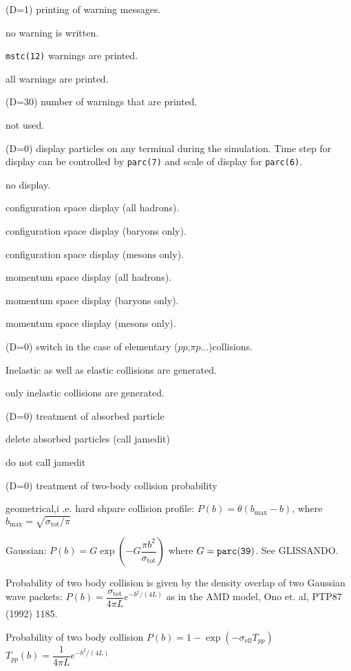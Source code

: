 \documentclass[]{article}
\newenvironment{entry}%
{\begin{list}{}{\setlength{\topsep}{0mm} \setlength{\itemsep}{0mm}
\setlength{\parskip}{0mm} \setlength{\parsep}{0mm}
\setlength{\leftmargin}{20mm} \setlength{\rightmargin}{0mm}
\setlength{\labelwidth}{18mm} \setlength{\labelsep}{2mm}}}%
{\end{list}}
\newenvironment{subentry}%
{\begin{list}{}{\setlength{\topsep}{0mm} \setlength{\itemsep}{0mm}
\setlength{\parskip}{0mm} \setlength{\parsep}{0mm}
\setlength{\leftmargin}{10mm} \setlength{\rightmargin}{0mm}
\setlength{\labelwidth}{18mm} \setlength{\labelsep}{2mm}}}%
{\end{list}}
\newcommand{\ttt}[1]{{\tt#1}}
\newcommand{\itemt}[1]{\item[{\tt #1}\hfill]}
\begin{document}
\begin{entry}
\itemt{mstc(13)  :} (D=1) printing of warning messages.
  \begin{subentry}
        \itemt{$=0$:} no warning is written.
        \itemt{$=1$:} \ttt{mstc(12)} warnings are printed.
        \itemt{$=2$:} all warnings are printed.
  \end{subentry}

\itemt{mstc(14)  :} (D=30) number of warnings that are printed.

\itemt{mstc(15)  :} not used.

\itemt{mstc(16)  :}(D=0) display particles on any terminal during the 
                   simulation.  Time step for display can be controlled
                   by \ttt{parc(7)} and scale of display for \ttt{parc(6)}.
\begin{subentry}
       \itemt{$=0$ :} no display.
       \itemt{$=1$ :} configuration space display (all hadrons).
       \itemt{$=2$ :} configuration space display (baryons only).
       \itemt{$=3$ :} configuration space display (mesons only).
       \itemt{$=11$:} momentum space display (all hadrons).
       \itemt{$=12$:} momentum space display (baryons only).
       \itemt{$=13$:} momentum space display (mesons only).
\end{subentry}

\itemt{mstc(17):} (D=0) switch in the case of elementary
           ($pp$,$\pi p$...)collisions.
\begin{subentry}
       \itemt{$=0$ :} Inelastic as well as  elastic collisions are
                      generated.
       \itemt{$=1$ :} only inelastic collisions are generated.
\end{subentry}

\itemt{mstc(18):}(D=0)  treatment of absorbed particle
\begin{subentry}
       \itemt{$=0$ :} delete absorbed particles (call jamedit)
       \itemt{$=1$ :} do not call jamedit
\end{subentry}
\itemt{mstc(19)  :}(D=0) treatment of two-body collision probability 
\begin{subentry}
       \itemt{$=0$ :} geometrical,i .e. hard shpare collision profile:
        $P(b)=\theta(b_\text{max}-b)$, 
       where $b_\text{max}=\sqrt{\sigma_\text{tot}/\pi}$
       \itemt{$=1$ :} Gaussian:
       $P(b)=G\exp\left(-G\dfrac{\pi b^2}{\sigma_\text{tot}}\right)$
       where $G=\ttt{parc(39)}$. See GLISSANDO.
       \itemt{$=2$ :} Probability of two body collision 
        is given by the density overlap of two Gaussian wave packets:
	$P(b)=\dfrac{\sigma_\text{tot}}{4\pi L}e^{-b^2/(4L)}$
	as in the AMD model, Ono et. al, PTP87 (1992) 1185.
       \itemt{$=3$ :} Probability of two body collision 
	$P(b)=1 - \exp(-\sigma_\text{eff}T_{pp}) $
	$T_{pp}(b)=\dfrac{1}{4\pi L}e^{-b^2/(4L)}$
      

\end{subentry}
\end{entry}
\end{document}
